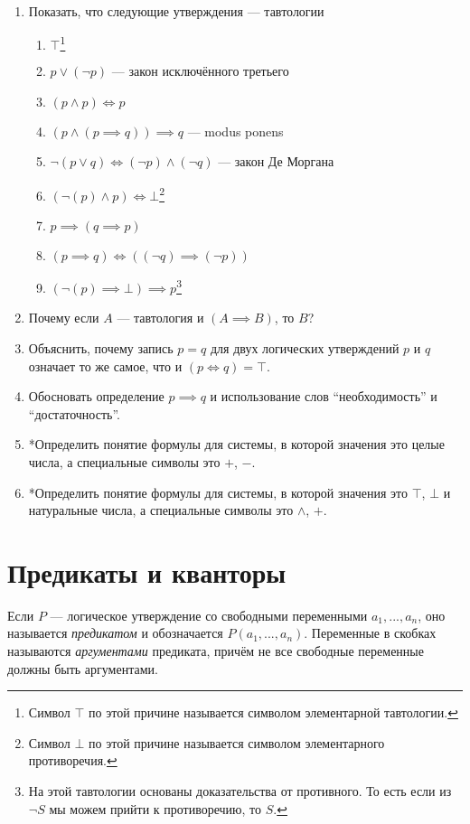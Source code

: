 \begin{enumerate}
	\item{}Показать, что следующие утверждения --- тавтологии
	\begin{enumerate}
		\item{}$\top$\footnote{Символ $\top$ по этой причине называется
			символом элементарной тавтологии.}
		\item{}$p\lor (\lnot p)$ --- закон исключённого третьего
		\item{}$(p\land p)\iff p$
		\item{}$(p\land (p\implies q))\implies q$ --- modus ponens
		\item{}$\lnot(p\lor q)\iff (\lnot p)\land (\lnot q)$ --- закон Де Моргана
		\item{}$(\lnot(p)\land p)\iff\bot$\footnote{Символ $\bot$ по этой причине называется
			символом элементарного противоречия.}
		\item{}$p\implies (q\implies p)$
		\item{}${(p\implies q)\iff ((\lnot q)\implies (\lnot p))}$
		\item{}$(\lnot(p)\implies\bot)\implies p$\footnote{На этой тавтологии основаны
			доказательства от противного. То есть если из $\lnot S$ мы можем прийти
			к противоречию, то $S$.}
	\end{enumerate}
	\item{}Почему если $A$ --- тавтология и $(A\implies B)$, то $B$?
	\item{}Объяснить, почему запись $p=q$ для двух логических утверждений $p$ и $q$
	означает то же самое, что и $(p\iff q)=\top$.
	\item{}\label{ex:imply_def}Обосновать определение ${p\implies q}$ и использование
	слов ``необходимость'' и ``достаточность''.
	\item{}*Определить понятие формулы для системы, в которой значения это целые числа,
	а специальные символы это $+$, $-$.
	\item{}*Определить понятие формулы для системы, в которой значения это $\top$, $\bot$
	и натуральные числа, а специальные символы это $\land$,  $+$.
\end{enumerate}

\section{Предикаты и кванторы}

Если $P$ --- логическое утверждение со свободными переменными $a_1,...,a_{n}$,
оно называется {\it предикатом} и обозначается $P(a_1,...,a_{n})$. Переменные
в скобках называются {\it аргументами} предиката, причём не все свободные
переменные должны быть аргументами.

